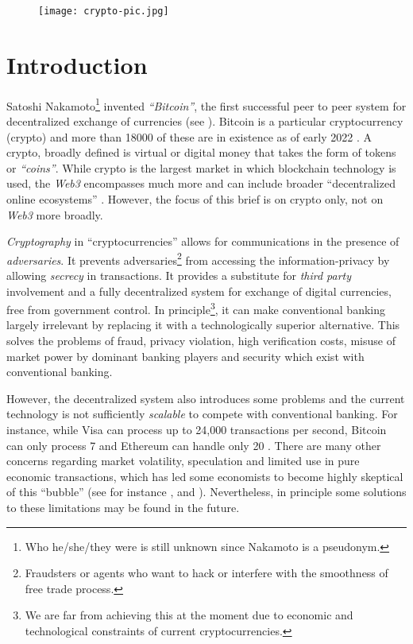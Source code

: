 \documentclass[12pt]{article}
\newcommand{\1}{\mathbbm 1}
\begin{document}
			\begin{figure}[H]
			\begin{center}
				\texttt{[image: crypto-pic.jpg]}		
				\caption*{}
			\end{center}
		\end{figure}
	
	
	\tableofcontents
	
	\newpage{}
		
		
		\section{Introduction}
		
		
		
			Satoshi Nakamoto\footnote{Who he/she/they were is still unknown since Nakamoto is a pseudonym.} invented \textit{``Bitcoin''}, the first successful peer to peer system for decentralized exchange of currencies (see \cite{nakamoto2008bitcoin}). Bitcoin is a particular cryptocurrency (crypto) and more than 18000 of these are in existence as of early 2022 \cite{hayesinvestopedia2022}. A crypto, broadly defined is virtual or digital money that takes the form of tokens or \textit{``coins''}. While crypto is the largest market in which blockchain technology is used, the \textit{Web3} encompasses much more and can include broader ``decentralized online ecosystems'' \cite{korpal2022decentralization}. However, the focus of this brief is on crypto only, not on \textit{Web3} more broadly.
			
			
			\textit{Cryptography} in ``cryptocurrencies'' allows for communications in the presence of \textit{adversaries}. It prevents adversaries\footnote{Fraudsters or agents who want to hack or interfere with the smoothness of free trade process.} from accessing the information-privacy by allowing \textit{secrecy} in transactions. It provides a substitute for \textit{third party} involvement and a fully decentralized system for exchange of digital currencies, free from government control. In principle\footnote{We are far from achieving this at the moment due to economic and technological constraints of current cryptocurrencies.}, it can make conventional banking largely irrelevant by replacing it with a technologically superior alternative. This solves the problems of fraud, privacy violation, high verification costs, misuse of market power by dominant banking players and security which exist with conventional banking.
			
			
			However, the decentralized system also introduces some problems and the current technology is not sufficiently \textit{scalable} to compete with conventional banking. For instance, while Visa can process up to 24,000 transactions per second, Bitcoin can only process 7 and Ethereum can handle only 20 \cite{crypto}. There are many other concerns regarding market volatility, speculation and limited use in pure economic transactions, which has led some economists to become highly skeptical of this ``bubble'' (see for instance \cite{krugman2018transaction}, \cite{roubini2018blockchain} and \cite{cochrane2017bitcoin}). Nevertheless, in principle some solutions to these limitations may be found in the future.
			
\end{document}
